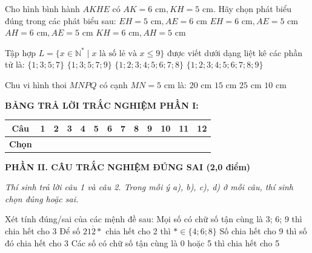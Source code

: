 \documentclass[12pt,a4paper]{article}
\begin{document}
\begin{ex}
Cho hình bình hành $AKHE$ có $AK = 6\text{ cm}, KH = 5\text{ cm}$. Hãy chọn phát biểu đúng trong các phát biểu sau:
\choice
{$EH = 5\text{ cm}, AE = 6\text{ cm}$}
{\True $EH = 6\text{ cm}, AE = 5\text{ cm}$}
{$AH = 6\text{ cm}, AE = 5\text{ cm}$}
{$KH = 6\text{ cm}, AH = 5\text{ cm}$}
\end{ex}

\begin{ex}
Tập hợp $L = \{x \in \mathbb{N}^* \mid x \text{ là số lẻ và } x \le 9\}$ được viết dưới dạng liệt kê các phần tử là:
\choice
{$\{1; 3; 5; 7\}$}
{\True $\{1; 3; 5; 7; 9\}$}
{$\{1; 2; 3; 4; 5; 6; 7; 8\}$}
{$\{1; 2; 3; 4; 5; 6; 7; 8; 9\}$}
\end{ex}

\begin{ex}
Chu vi hình thoi $MNPQ$ có cạnh $MN = 5\text{ cm}$ là:
\choice
{\True $20\text{ cm}$}
{$15\text{ cm}$}
{$25\text{ cm}$}
{$10\text{ cm}$}
\end{ex}


\vspace{1mm}
\noindent\textbf{BẢNG TRẢ LỜI TRẮC NGHIỆM PHẦN I:}
\begin{center}
\begin{tabular}{|c|c|c|c|c|c|c|c|c|c|c|c|c|}
\hline
\textbf{Câu} & \textbf{1} & \textbf{2} & \textbf{3} & \textbf{4} & \textbf{5} & \textbf{6} & \textbf{7} & \textbf{8} & \textbf{9} & \textbf{10} & \textbf{11} & \textbf{12} \\
\hline
\textbf{Chọn} & \rule{0pt}{0.65cm} & & & & & & & & & & & \\
\hline
\end{tabular}
\end{center}
\vspace{2mm}

\setcounter{ex}{0}
\noindent\textbf{\large PHẦN II. CÂU TRẮC NGHIỆM ĐÚNG SAI (2,0 điểm)}

\textit{Thí sinh trả lời câu 1 và câu 2. Trong mỗi ý a), b), c), d) ở mỗi câu, thí sinh chọn đúng hoặc sai.}

\vspace{1mm}
\begin{ex}
Xét tính đúng/sai của các mệnh đề sau:
\choiceTF
{Mọi số có chữ số tận cùng là 3; 6; 9 thì chia hết cho 3}
{Để số $\overline{212*}$ chia hết cho 2 thì $* \in \{4; 6; 8\}$}
{\True Số chia hết cho 9 thì số đó chia hết cho 3}
{\True Các số có chữ số tận cùng là 0 hoặc 5 thì chia hết cho 5}
\end{ex}
\end{document}
